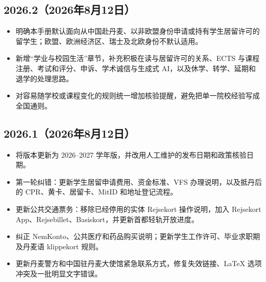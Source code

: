 \subsection*{2026.2（2026年8月12日）}
\begin{itemize}
  \item 明确本手册默认面向从中国赴丹麦、以非欧盟身份申请或持有学生居留许可的留学生；欧盟、欧洲经济区、瑞士及北欧身份不默认适用。
  \item 新增“学业与校园生活”章节，补充积极在读与居留许可的关系、ECTS 与课程注册、考试和评分、申诉、学术诚信与生成式 AI，以及休学、转学、延期和退学的处理思路。
  \item 对容易随学校或课程变化的规则统一增加核验提醒，避免把单一院校经验写成全国通则。
\end{itemize}

\subsection*{2026.1（2026年8月12日）}
\begin{itemize}
  \item 将版本更新为 2026--2027 学年版，并改用人工维护的发布日期和政策核验日期。
  \item 第一轮纠错：更新学生居留申请费用、资金标准、VFS 办理说明，以及抵丹后的 CPR、黄卡、居留卡、MitID 和地址登记流程。
  \item 更新公共交通票务：移除已经停用的实体 Rejsekort 操作说明，加入 Rejsekort App、Rejsebillet、Basiskort，并更新首都轻轨开放进度。
  \item 纠正 NemKonto、公共医疗和药品购买说明；更新学生工作许可、毕业求职期及丹麦语 klippekort 规则。
  \item 更新丹麦警方和中国驻丹麦大使馆紧急联系方式，修复失效链接、LaTeX 选项冲突及一批明显文字错误。
\end{itemize}
